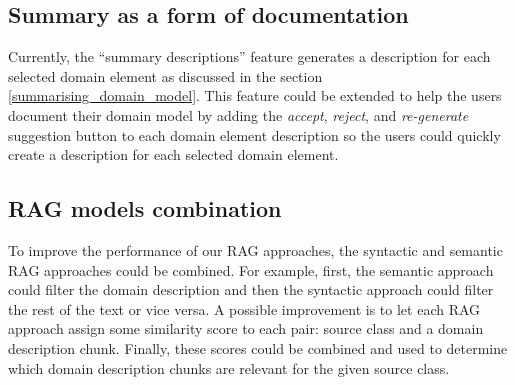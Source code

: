 \subsection{Summary as a form of documentation}

Currently, the ``summary descriptions'' feature generates a description for each selected domain element as discussed in the section \ref{summarising_domain_model}. This feature could be extended to help the users document their domain model by adding the \textit{accept}, \textit{reject}, and \textit{re-generate} suggestion button to each domain element description so the users could quickly create a description for each selected domain element.


\subsection{RAG models combination}

To improve the performance of our RAG approaches, the syntactic and semantic RAG approaches could be combined. For example, first, the semantic approach could filter the domain description and then the syntactic approach could filter the rest of the text or vice versa. A possible improvement is to let each RAG approach assign some similarity score to each pair: source class and a domain description chunk. Finally, these scores could be combined and used to determine which domain description chunks are relevant for the given source class.
